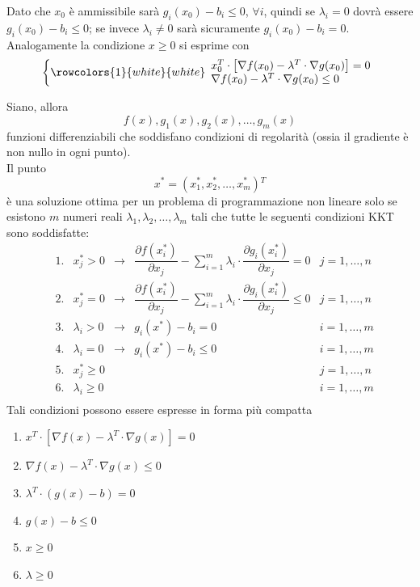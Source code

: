 \documentclass[a4paper]{extarticle}
\begin{document}
Dato che $x_0$ è ammissibile sarà $g_i(x_0) - b_i \leq 0$, $\forall i$, quindi se $\lambda_i = 0$ dovrà essere $g_i(x_0) - b_i \leq 0$; se invece $\lambda_i \neq 0$ sarà sicuramente $g_i(x_0) - b_i = 0$.\\
Analogamente la condizione $x \geq 0$ si esprime con
\[
    \left\{
        \rowcolors{1}{white}{white}
        \begin{array}{lll}
            x_0^T \cdot \left[\nabla f(x_0) - \lambda^T \cdot \nabla g(x_0)\right] = 0\\
            \nabla f(x_0) - \lambda^T \cdot \nabla g(x_0) \leq 0
        \end{array}
    \right.
\]

\vspace{1em}
\noindent
Siano, allora
\[f(x), g_1 (x), g_2 (x), \dots , g_m (x)\]
funzioni differenziabili che soddisfano condizioni di regolarità (ossia il gradiente è non nullo in ogni punto).\\
Il punto 
\[x^* = (x_1^* , x_2^* , \dots , x_m^*){^T}\]
è una soluzione ottima per un problema di programmazione non lineare solo se esistono $m$ numeri reali $\lambda_1, \lambda_2, \dots, \lambda_m$ tali che tutte le seguenti condizioni KKT sono soddisfatte:
\begin{align*}
    &1.&x_j^* > 0 &\rightarrow& \dfrac{\partial f(x_i^*)}{\partial x_j} - \sum_{i=1}^m \lambda_i \cdot \dfrac{\partial g_i(x_i^*)}{\partial x_j} = 0 & j = 1,\dots,n\\
    &2.&x_j^* = 0 &\rightarrow& \dfrac{\partial f(x_i^*)}{\partial x_j} - \sum_{i=1}^m \lambda_i \cdot \dfrac{\partial g_i(x_i^*)}{\partial x_j} \leq 0 & j = 1,\dots,n\\
    &3.&\lambda_i > 0 &\rightarrow& g_i(x^*)-b_i=0 & i = 1,\dots,m\\
    &4.&\lambda_i = 0 &\rightarrow& g_i(x^*)-b_i \leq 0 & i = 1,\dots,m\\
    &5.&x_j^* \geq 0 & & & j= 1,\dots,n\\
    &6.&\lambda_i \geq 0 & & & i = 1,\dots,m\\
\end{align*}
Tali condizioni possono essere espresse in forma più compatta
\begin{enumerate}
    \item $x^T \cdot \left[\nabla f(x) - \lambda^T \cdot \nabla g(x)\right] = 0$
    \item $\nabla f(x) - \lambda^T \cdot \nabla g(x) \leq 0$
    \item $\lambda^T \cdot (g(x) - b) = 0$
    \item $g(x) - b \leq 0$
    \item $x \geq 0$
    \item $\lambda \geq 0$
\end{enumerate}
\end{document}
